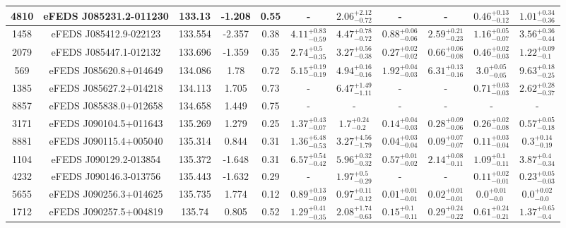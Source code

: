 \documentclass[fleqn,usenatbib]{mnras}
\begin{document}
\begin{table}
\begin{center}
\begin{tabular}{ccccccccccc}
\hline
4810 & eFEDS J085231.2-011230 & 133.13 & -1.208 & 0.55 & - & $2.06^{+2.12}_{-0.72}$ & - & - & $0.46^{+0.13}_{-0.12}$ & $1.01^{+0.34}_{-0.36}$ \\ 
\hline
1458 & eFEDS J085412.9-022123 & 133.554 & -2.357 & 0.38 & $4.11^{+0.83}_{-0.59}$ & $4.47^{+0.78}_{-0.72}$ & $0.88^{+0.06}_{-0.06}$ & $2.59^{+0.21}_{-0.23}$ & $1.16^{+0.05}_{-0.07}$ & $3.56^{+0.36}_{-0.44}$ \\ 
\hline
2079 & eFEDS J085447.1-012132 & 133.696 & -1.359 & 0.35 & $2.74^{+0.5}_{-0.35}$ & $3.27^{+0.56}_{-0.38}$ & $0.27^{+0.02}_{-0.02}$ & $0.66^{+0.06}_{-0.08}$ & $0.46^{+0.02}_{-0.03}$ & $1.22^{+0.09}_{-0.1}$ \\ 
\hline
569 & eFEDS J085620.8+014649 & 134.086 & 1.78 & 0.72 & $5.15^{+0.19}_{-0.19}$ & $4.94^{+0.16}_{-0.16}$ & $1.92^{+0.04}_{-0.03}$ & $6.31^{+0.13}_{-0.16}$ & $3.0^{+0.05}_{-0.05}$ & $9.63^{+0.18}_{-0.25}$ \\ 
\hline
1385 & eFEDS J085627.2+014218 & 134.113 & 1.705 & 0.73 & - & $6.47^{+1.49}_{-1.11}$ & - & - & $0.71^{+0.03}_{-0.03}$ & $2.62^{+0.28}_{-0.37}$ \\ 
\hline
8857 & eFEDS J085838.0+012658 & 134.658 & 1.449 & 0.75 & - & - & - & - & - & - \\ 
\hline
3171 & eFEDS J090104.5+011643 & 135.269 & 1.279 & 0.25 & $1.37^{+0.43}_{-0.07}$ & $1.7^{+0.24}_{-0.2}$ & $0.14^{+0.04}_{-0.03}$ & $0.28^{+0.09}_{-0.06}$ & $0.26^{+0.02}_{-0.08}$ & $0.57^{+0.05}_{-0.18}$ \\ 
\hline
8881 & eFEDS J090115.4+005040 & 135.314 & 0.844 & 0.31 & $1.36^{+6.48}_{-0.53}$ & $3.27^{+4.56}_{-1.79}$ & $0.04^{+0.03}_{-0.04}$ & $0.09^{+0.07}_{-0.07}$ & $0.11^{+0.03}_{-0.04}$ & $0.3^{+0.14}_{-0.19}$ \\ 
\hline
1104 & eFEDS J090129.2-013854 & 135.372 & -1.648 & 0.31 & $6.57^{+0.54}_{-0.42}$ & $5.96^{+0.32}_{-0.32}$ & $0.57^{+0.01}_{-0.02}$ & $2.14^{+0.08}_{-0.11}$ & $1.09^{+0.1}_{-0.11}$ & $3.87^{+0.4}_{-0.34}$ \\ 
\hline
4232 & eFEDS J090146.3-013756 & 135.443 & -1.632 & 0.29 & - & $1.97^{+0.5}_{-0.29}$ & - & - & $0.11^{+0.02}_{-0.01}$ & $0.23^{+0.05}_{-0.03}$ \\ 
\hline
5655 & eFEDS J090256.3+014625 & 135.735 & 1.774 & 0.12 & $0.89^{+0.13}_{-0.09}$ & $0.97^{+0.11}_{-0.12}$ & $0.01^{+0.01}_{-0.01}$ & $0.02^{+0.01}_{-0.01}$ & $0.0^{+0.01}_{-0.0}$ & $0.0^{+0.02}_{-0.0}$ \\ 
\hline
1712 & eFEDS J090257.5+004819 & 135.74 & 0.805 & 0.52 & $1.29^{+0.41}_{-0.35}$ & $2.08^{+1.74}_{-0.63}$ & $0.15^{+0.1}_{-0.11}$ & $0.29^{+0.24}_{-0.22}$ & $0.61^{+0.24}_{-0.21}$ & $1.37^{+0.65}_{-0.4}$ \\ 

\end{tabular}
\end{center}
\end{table}
\end{document}
